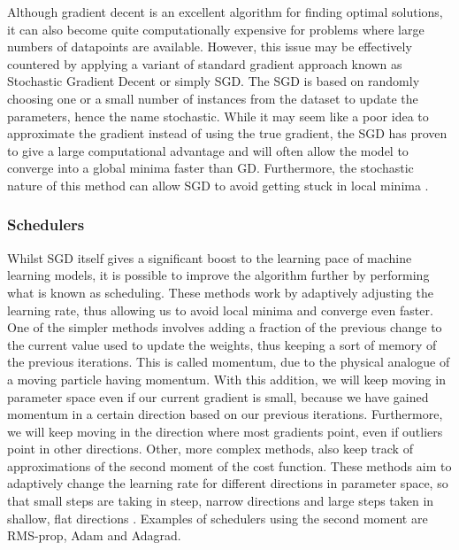 \documentclass[onecolumn,10pt,cleanfoot]{asme2ej}
\begin{document}
Although gradient decent is an excellent algorithm for finding optimal solutions, it can also become quite computationally expensive for problems where large numbers of datapoints are available. However, this issue may be effectively countered by applying a variant of standard gradient approach known as Stochastic Gradient Decent or simply SGD. The SGD is based on randomly choosing one or a small number of instances from the dataset to update the parameters, hence the name stochastic. While it may seem like a poor idea to approximate the gradient instead of using the true gradient, the SGD has proven to give a large computational advantage and will often allow the model to converge into a global minima faster than GD. Furthermore, the stochastic nature of this method can allow SGD to avoid getting stuck in local minima \cite[46]{sr}.

\subsubsection{Schedulers}

Whilst SGD itself gives a significant boost to the learning pace of machine learning models, it is possible to improve the algorithm further by performing what is known as scheduling. These methods work by adaptively adjusting the learning rate, thus allowing us to avoid local minima and converge even faster. One of the simpler methods involves adding a fraction of the previous change to the current value used to update the weights, thus keeping a sort of memory of the previous iterations. This is called momentum, due to the physical analogue of a moving particle having momentum. With this addition, we will keep moving in parameter space even if our current gradient is small, because we have gained momentum in a certain direction based on our previous iterations. Furthermore, we will keep moving in the direction where most gradients point, even if outliers point in other directions. Other, more complex methods, also keep track of approximations of the second moment of the cost function. These methods aim to adaptively change the learning rate for different directions in parameter space, so that small steps are taking in steep, narrow directions and large steps taken in shallow, flat directions \cite{mortensched}. Examples of schedulers using the second moment are RMS-prop, Adam and Adagrad.

\end{document}
